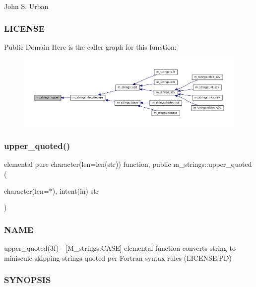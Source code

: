 John S. Urban \subsubsection*{L\+I\+C\+E\+N\+SE}

Public Domain Here is the caller graph for this function\+:
\nopagebreak
\begin{figure}[H]
\begin{center}
\leavevmode
\includegraphics[width=350pt]{namespacem__strings_a0953ac5c4d31339fdd8ec3acc9c3c915_icgraph}
\end{center}
\end{figure}
\mbox{\label{namespacem__strings_a3bd3b1de054c81fcc18b69afc369fb21}} 
\subsubsection{\texorpdfstring{upper\+\_\+quoted()}{upper\_quoted()}}
{\footnotesize\ttfamily elemental pure character(len=len(str)) function, public m\+\_\+strings\+::upper\+\_\+quoted (\begin{DoxyParamCaption}\item[{character(len=$\ast$), intent(in)}]{str }\end{DoxyParamCaption})}



\subsubsection*{N\+A\+ME}

upper\+\_\+quoted(3f) -\/ \mbox{[}M\+\_\+strings\+:C\+A\+SE\mbox{]} elemental function converts string to miniscule skipping strings quoted per Fortran syntax rules (L\+I\+C\+E\+N\+SE\+:PD) 

\subsubsection*{S\+Y\+N\+O\+P\+S\+IS}


